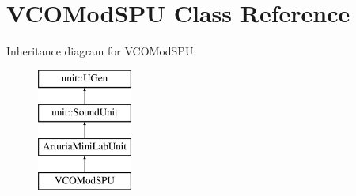 \hypertarget{classVCOModSPU}{\section{V\-C\-O\-Mod\-S\-P\-U Class Reference}
\label{classVCOModSPU}
}
Inheritance diagram for V\-C\-O\-Mod\-S\-P\-U\-:\begin{figure}[H]
\begin{center}
\leavevmode
\includegraphics[height=4.000000cm]{classVCOModSPU}
\end{center}
\end{figure}

